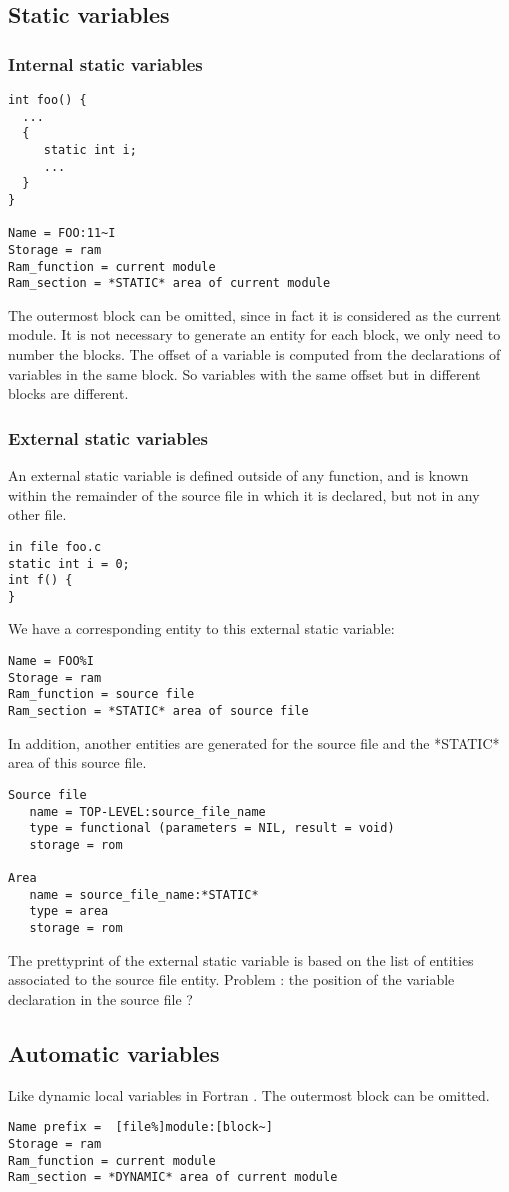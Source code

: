 \documentclass[a4paper]{article}
\begin{document}
\subsection{Static variables}
\subsubsection{Internal static variables}
\begin{verbatim}
int foo() {
  ...
  {
     static int i;
     ...
  } 
}

Name = FOO:11~I
Storage = ram 
Ram_function = current module
Ram_section = *STATIC* area of current module
\end{verbatim}
The outermost block can be omitted, since in fact it is considered as the current module. It is not necessary to generate an entity for each block, we only need to
number the blocks. The offset of a variable is computed from the
declarations of variables in the same block. So variables with the same
offset but in different blocks are different. 
\subsubsection{External static variables}
An external static variable is defined outside of any function, and is
known within the remainder of the source file in which it is declared, but
not in any other file. 
\begin{verbatim}
in file foo.c
static int i = 0; 
int f() {
}
\end{verbatim}
We have a corresponding entity to this external static variable:
\begin{verbatim}
Name = FOO%I
Storage = ram 
Ram_function = source file  
Ram_section = *STATIC* area of source file 
\end{verbatim}
In addition, another entities are generated for the source file and the *STATIC* area of this
source file.
\begin{verbatim}
Source file
   name = TOP-LEVEL:source_file_name
   type = functional (parameters = NIL, result = void)
   storage = rom

Area
   name = source_file_name:*STATIC*
   type = area
   storage = rom
\end{verbatim}
 The prettyprint of the external static variable is based on the list of
entities associated to the source file entity. Problem : the position of the variable
declaration in the source file ? 
\subsection{Automatic variables}
Like dynamic local variables in Fortran \cite{Coel01}. The outermost block can be omitted. 
\begin{verbatim}
Name prefix =  [file%]module:[block~]
Storage = ram 
Ram_function = current module 
Ram_section = *DYNAMIC* area of current module
\end{verbatim}
\end{document}
